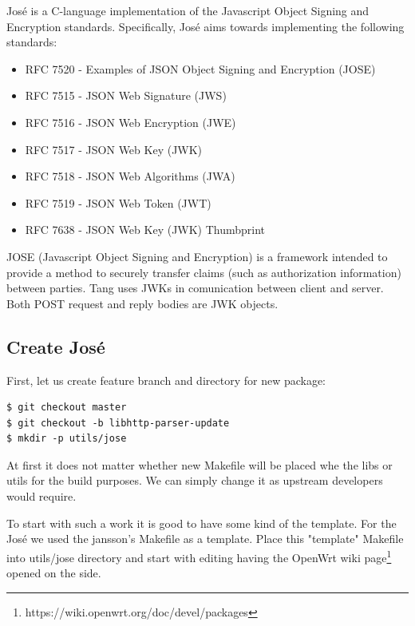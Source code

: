 José is a C-language implementation of the Javascript Object Signing and Encryption standards.
Specifically, José aims towards implementing the following standards:
\begin{itemize}
    \item RFC 7520 - Examples of JSON Object Signing and Encryption (JOSE) \cite{RFC7520}
    \item RFC 7515 - JSON Web Signature (JWS)        \cite{RFC7515}
    \item RFC 7516 - JSON Web Encryption (JWE)       \cite{RFC7516}
    \item RFC 7517 - JSON Web Key (JWK)              \cite{RFC7517}
    \item RFC 7518 - JSON Web Algorithms (JWA)       \cite{RFC7518}
    \item RFC 7519 - JSON Web Token (JWT)            \cite{RFC7519}
    \item RFC 7638 - JSON Web Key (JWK) Thumbprint   \cite{RFC7638}
\end{itemize}

JOSE (Javascript Object Signing and Encryption) is a framework intended to provide a method to securely transfer claims (such as authorization information) between parties.
Tang uses JWKs in comunication between client and server.
Both POST request and reply bodies are JWK objects\cite{jose_prog}.



\subsection{Create José}\label{jose}

First, let us create feature branch and directory for new package:
\begin{lstlisting}[columns=fixed,basicstyle=\ttfamily\footnotesize,tabsize=4,backgroundcolor=\color{yellow!10}]
$ git checkout master
$ git checkout -b libhttp-parser-update
$ mkdir -p utils/jose
\end{lstlisting}
At first it does not matter whether new Makefile will be placed whe the libs or utils for the build purposes.
We can simply change it as upstream developers would require.

To start with such a work it is good to have some kind of the template.
For the José we used the jansson's Makefile as a template.
Place this "template" Makefile into utils/jose directory and start with editing having the OpenWrt wiki page\footnote{https://wiki.openwrt.org/doc/devel/packages} opened on the side.

